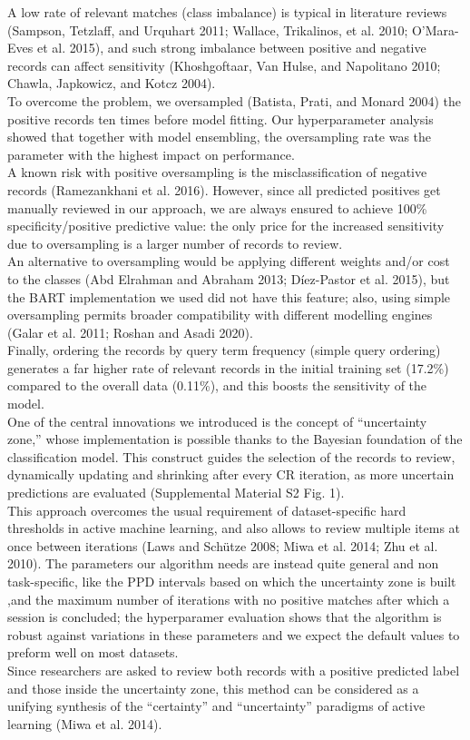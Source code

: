 \documentclass{article}
\begin{document}
A low rate of relevant matches (class imbalance) is typical in
literature reviews (Sampson, Tetzlaff, and Urquhart 2011; Wallace,
Trikalinos, et al. 2010; O'Mara-Eves et al. 2015), and such strong
imbalance between positive and negative records can affect sensitivity
(Khoshgoftaar, Van Hulse, and Napolitano 2010; Chawla, Japkowicz, and
Kotcz 2004).\\
To overcome the problem, we oversampled (Batista, Prati, and Monard
2004) the positive records ten times before model fitting. Our
hyperparameter analysis showed that together with model ensembling, the
oversampling rate was the parameter with the highest impact on
performance.\\
A known risk with positive oversampling is the misclassification of
negative records (Ramezankhani et al. 2016). However, since all
predicted positives get manually reviewed in our approach, we are always
ensured to achieve 100\% specificity/positive predictive value: the only
price for the increased sensitivity due to oversampling is a larger
number of records to review.\\
An alternative to oversampling would be applying different weights
and/or cost to the classes (Abd Elrahman and Abraham 2013; Díez-Pastor
et al. 2015), but the BART implementation we used did not have this
feature; also, using simple oversampling permits broader compatibility
with different modelling engines (Galar et al. 2011; Roshan and Asadi
2020).\\
Finally, ordering the records by query term frequency (simple query
ordering) generates a far higher rate of relevant records in the initial
training set (17.2\%) compared to the overall data (0.11\%), and this
boosts the sensitivity of the model.\\

One of the central innovations we introduced is the concept of
``uncertainty zone,'' whose implementation is possible thanks to the
Bayesian foundation of the classification model. This construct guides
the selection of the records to review, dynamically updating and
shrinking after every CR iteration, as more uncertain predictions are
evaluated (Supplemental Material S2 Fig. 1).\\
This approach overcomes the usual requirement of dataset-specific hard
thresholds in active machine learning, and also allows to review
multiple items at once between iterations (Laws and Schütze 2008; Miwa
et al. 2014; Zhu et al. 2010). The parameters our algorithm needs are
instead quite general and non task-specific, like the PPD intervals
based on which the uncertainty zone is built ,and the maximum number of
iterations with no positive matches after which a session is concluded;
the hyperparamer evaluation shows that the algorithm is robust against
variations in these parameters and we expect the default values to
preform well on most datasets.\\
Since researchers are asked to review both records with a positive
predicted label and those inside the uncertainty zone, this method can
be considered as a unifying synthesis of the ``certainty'' and
``uncertainty'' paradigms of active learning (Miwa et al. 2014).\\
\end{document}
